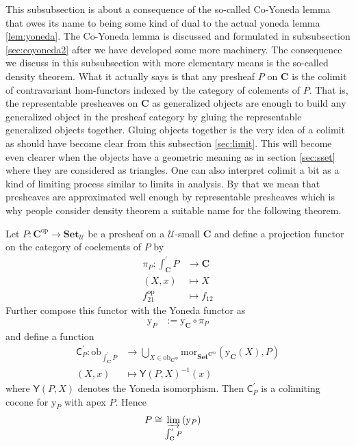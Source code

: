 This subsubsection is about a consequence of the so-called Co-Yoneda lemma that owes its name to being some kind of dual to the actual yoneda lemma \ref{lem:yoneda}. The Co-Yoneda lemma is discussed and formulated in subsubsection \ref{sec:coyoneda2} after we have developed some more machinery. The consequence we discuss in this subsubsection with more elementary means is the so-called density theorem.  What it actually says is that any presheaf $P$ on $\mathbf{C}$ is the colimit of contravariant hom-functors indexed by the category of colements of $P$. That is, the representable presheaves on $\mathbf{C}$ as generalized objects are enough to build any generalized object in the presheaf category by gluing the representable generalized objects together. Gluing objects together is the very idea of a colimit as should have become clear from this subsection \ref{sec:limit}. This will become even clearer when the objects have a geometric meaning as in section \ref{sec:sset} where they are considered as triangles. One can also interpret colimit a bit as a kind of limiting process similar to limits in analysis. By that we mean that presheaves are {\glqq}approximated{\grqq} well enough by representable presheaves which is why people consider density theorem a suitable name for the following theorem.
\\
\begin{thm}[Density]
\label{thm:density}
Let $P \colon \mathbf{C}^{\mathrm{op}} \rightarrow \mathbf{Set}_{\mathcal{U}}$ be a presheaf on a $\mathcal{U}$-small $\mathbf{C}$ and define a projection functor on the category of coelements of $P$ by
\begin{align*}
  \pi_{P}
  \colon
  \int_{\mathbf{C}}^{\prime}
  P
  &\rightarrow
  \mathbf{C}
  \\
  (X,x)
  &\mapsto
  X
  \\
  f_{21}^{\mathrm{op}}
  &\mapsto
  f_{12}
\end{align*}
Further compose this functor with the Yoneda functor as
\begin{align*}
  \mathrm{y}_{P}
  &:=
  \mathrm{y}_{\mathbf{C}}
  \circ
  \pi_{P}
\end{align*}
and define a function
\begin{align*}
  \mathsf{C}_{P}^{\prime}
  \colon
  \mathrm{ob}_{\int_{\mathbf{C}}^{\prime}P}
  &\rightarrow
  \bigcup_{X \in \mathrm{ob}_{\mathbf{C}^{\mathrm{op}}}}
  \mathrm{mor}_{\mathbf{Set}^{\mathbf{C}^{\mathrm{op}}}}
  \left(
    \mathrm{y}_{\mathbf{C}}(X),
    P
  \right)
  \\
  (X,x)
  &\mapsto
  \mathsf{Y}(P,X)^{-1}(x)
\end{align*}
where $\mathsf{Y}(P,X)$ denotes the Yoneda isomorphism. Then $\mathsf{C}_{P}^{\prime}$ is a colimiting cocone for $\mathrm{y}_{P}$ with apex $P$. Hence
\begin{align*}
  P
  &\cong
  \varinjlim_{\int_{\mathbf{C}}^{\prime}P}(\mathrm{y}_{P})
\end{align*}
\end{thm}
